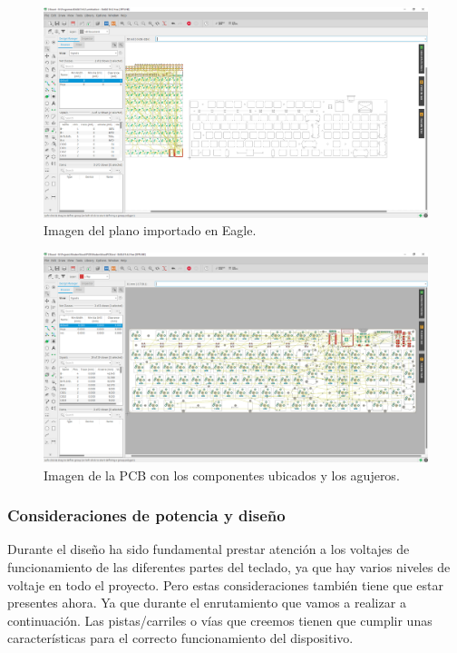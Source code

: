 \begin{figure}[H]
    \centering
    \includegraphics[width=1\textwidth]{imagenes/Capitulos/Cap05/EaglePCBPlano.png}
    \caption{Imagen del plano importado en Eagle.}
    \label{fig:EaglePCBPlano}
\end{figure}

\begin{figure}[H]
    \centering
    \includegraphics[width=1\textwidth]{imagenes/Capitulos/Cap05/EaglePCBPartesColocadas.png}
    \caption{Imagen de la \gls{PCB} con los componentes ubicados y los agujeros.}
    \label{fig:EaglePCBPartesColocadas}
\end{figure}
\newpage
\subsubsection{Consideraciones de potencia y diseño}
Durante el diseño ha sido fundamental prestar atención a los voltajes de funcionamiento de las diferentes partes del teclado, ya que hay varios niveles de voltaje en todo el proyecto. Pero estas consideraciones también tiene que estar presentes ahora. Ya que durante el enrutamiento que vamos a realizar a continuación. Las pistas/carriles o vías que creemos tienen que cumplir unas características para el correcto funcionamiento del dispositivo.

